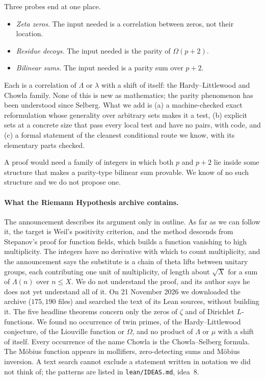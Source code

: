 \documentclass[11pt]{article}
\theoremstyle{definition}
\theoremstyle{remark}
\newcommand{\lean}[1]{\texttt{#1}}
\begin{document}
Three probes end at one place.

\begin{itemize}
\item \emph{Zeta zeros.} The input needed is a correlation between zeros, not
their location.
\item \emph{Residue decoys.} The input needed is the parity of $\Omega(p+2)$.
\item \emph{Bilinear sums.} The input needed is a parity sum over $p+2$.
\end{itemize}

Each is a correlation of $\Lambda$ or $\lambda$ with a shift of itself: the
Hardy--Littlewood and Chowla family. None of this is new as mathematics; the
parity phenomenon has been understood since Selberg. What we add is (a) a
machine-checked exact reformulation whose generality over arbitrary sets makes
it a test, (b) explicit sets at a concrete size that pass every local test and
have no pairs, with code, and (c) a formal statement of the cleanest conditional
route we know, with its elementary parts checked.

A proof would need a family of integers in which both $p$ and $p+2$ lie inside
some structure that makes a parity-type bilinear sum provable. We know of no
such structure and we do not propose one.

\paragraph{What the Riemann Hypothesis archive contains.} The announcement
\cite{rhclaim} describes its argument only in outline. As far as we can follow
it, the target is Weil's positivity criterion, and the method descends from
Stepanov's proof for function fields, which builds a function vanishing to high
multiplicity. The integers have no derivative with which to count multiplicity,
and the announcement says the substitute is a chain of theta lifts between
unitary groups, each contributing one unit of multiplicity, of length about
$\sqrt{X}$ for a sum of $\Lambda(n)$ over $n\le X$. We do not understand the
proof, and its author says he does not yet understand all of it. On 21 November
2026 we downloaded the archive ($175{,}190$ files) and searched the text of its
Lean sources, without building it. The five headline theorems concern only the
zeros of $\zeta$ and of Dirichlet $L$-functions. We found no occurrence of twin
primes, of the Hardy--Littlewood conjecture, of the Liouville function or
$\Omega$, and no product of $\Lambda$ or $\mu$ with a shift of itself. Every
occurrence of the name Chowla is the Chowla--Selberg formula. The M\"obius
function appears in mollifiers, zero-detecting sums and M\"obius inversion. A
text search cannot exclude a statement written in notation we did not think of;
the patterns are listed in \lean{lean/IDEAS.md}, idea~8.
\end{document}
